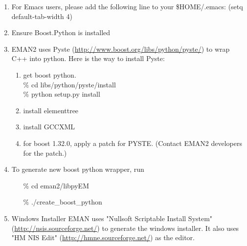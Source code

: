 \begin{enumerate}
  \item
    For Emacs users, please add the following line to your \$HOME/.emacs:
       (setq default-tab-width 4)

  \item
    Ensure Boost.Python is installed

  \item
    EMAN2 uses Pyste (\href{http://www.boost.org/libs/python/pyste/}{http://www.boost.org/libs/python/pyste/}) to wrap C++
    into python. Here is the way to install Pyste:

    \begin{enumerate}
      \item
        get boost python.\\
        \% cd libs/python/pyste/install \\
        \% python setup.py install \\
	\item
          install elementtree
	\item
          install GCCXML
	\item
         for boost 1.32.0, apply a patch for PYSTE.
           (Contact EMAN2 developers for the patch.)
    \end{enumerate}
    
    \item
      To generate new boost python wrapper, run
      \begin{itemize}
        \item[\%] cd eman2/libpyEM
        \item[\%] ./create\_boost\_python
      \end{itemize}

      \item
	Windows Installer
	EMAN uses "Nullsoft Scriptable Install System" (\href{http://nsis.sourceforge.net/}{http://nsis.sourceforge.net/})
	to generate the windows installer.
	It also uses "HM NIS Edit" (\href{http://hmne.sourceforge.net/}{http://hmne.sourceforge.net/}) as the editor.
	\end{enumerate}



%